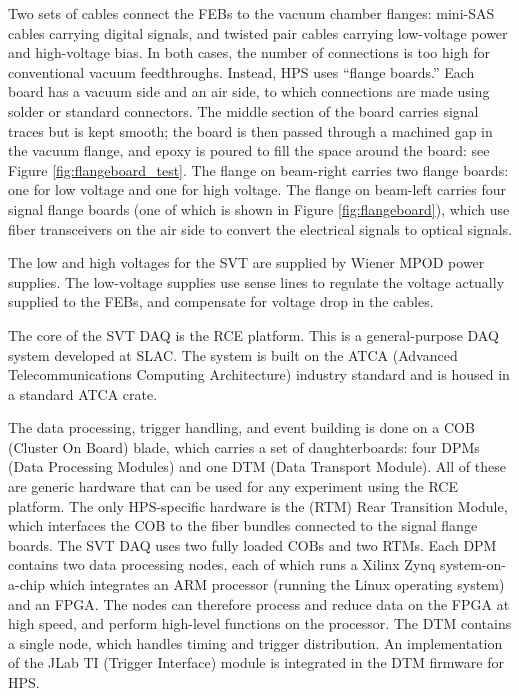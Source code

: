 Two sets of cables connect the FEBs to the vacuum chamber flanges: mini-SAS cables carrying digital signals, and twisted pair cables carrying low-voltage power and high-voltage bias.
In both cases, the number of connections is too high for conventional vacuum feedthroughs.
Instead, HPS uses ``flange boards.''
Each board has a vacuum side and an air side, to which connections are made using solder or standard connectors.
The middle section of the board carries signal traces but is kept smooth; the board is then passed through a machined gap in the vacuum flange, and epoxy is poured to fill the space around the board: see Figure \ref{fig:flangeboard_test}.
The flange on beam-right carries two flange boards: one for low voltage and one for high voltage.
The flange on beam-left carries four signal flange boards (one of which is shown in Figure \ref{fig:flangeboard}), which use fiber transceivers on the air side to convert the electrical signals to optical signals.

The low and high voltages for the SVT are supplied by Wiener MPOD power supplies.
The low-voltage supplies use sense lines to regulate the voltage actually supplied to the FEBs, and compensate for voltage drop in the cables.

The core of the SVT DAQ is the RCE platform.
This is a general-purpose DAQ system developed at SLAC.
The system is built on the ATCA (Advanced Telecommunications Computing Architecture) industry standard and is housed in a standard ATCA crate.

The data processing, trigger handling, and event building is done on a COB (Cluster On Board) blade, which carries a set of daughterboards: four DPMs (Data Processing Modules) and one DTM (Data Transport Module).
All of these are generic hardware that can be used for any experiment using the RCE platform.
The only HPS-specific hardware is the (RTM) Rear Transition Module, which interfaces the COB to the fiber bundles connected to the signal flange boards.
The SVT DAQ uses two fully loaded COBs and two RTMs.
Each DPM contains two data processing nodes, each of which runs a Xilinx Zynq system-on-a-chip which integrates an ARM processor (running the Linux operating system) and an FPGA.
The nodes can therefore process and reduce data on the FPGA at high speed, and perform high-level functions on the processor.
The DTM contains a single node, which handles timing and trigger distribution.
An implementation of the JLab TI (Trigger Interface) module is integrated in the DTM firmware for HPS.


